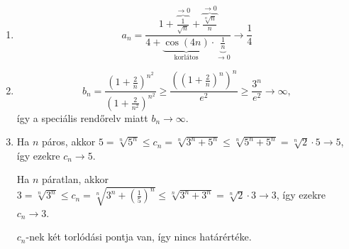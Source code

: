 \documentclass[11pt]{scrartcl}
\begin{document}
\begin{enumerate}
	\item \[
		      a_n
		      = \frac{
			      1 + \overbrace{\frac{1}{\sqrt{n}}}^{\to 0} + \overbrace{\frac{\sqrt[n]{n}}{n}}^{\to 0}
		      }{
			      4 + \underbrace{\cos(4n)}_{\text{korlátos}} \cdot \underbrace{\frac{1}{n}}_{\to 0}
		      }
		      \to \frac{1}{4}
	      \]

	\item \[
		      b_n
		      = \frac{\left(1 + \frac{2}{n}\right)^{n^2}}{\left(1 + \frac{2}{n^2}\right)^{n^2}}
		      \ge \frac{\left(\left(1 + \frac{2}{n}\right)^n\right)^n}{e^2}
		      \ge \frac{3^n}{e^2}
		      \to \infty,
	      \]
	      így a speciális rendőrelv miatt $b_n \to \infty$.

	\item Ha $n$ páros, akkor
	      \(
	      5 = \sqrt[n]{5^n} \le c_n = \sqrt[n]{3^n + 5^n} \le \sqrt[n]{5^n + 5^n}
	      = \sqrt[n]{2} \cdot 5 \to 5
	      \),
	      így ezekre $c_n \to 5$.

	      Ha $n$ páratlan, akkor
	      \(
	      3 = \sqrt[n]{3^n}
	      \le c_n = \sqrt[n]{3^n + \left(\frac{1}{5}\right)^n}
	      \le \sqrt[n]{3^n + 3^n} = \sqrt[n]{2} \cdot 3 \to 3
	      \),
	      így ezekre $c_n \to 3$.

	      $c_n$-nek két torlódási pontja van, így nincs határértéke.
\end{enumerate}
\end{document}
